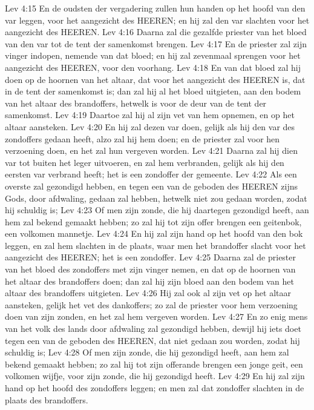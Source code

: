 Lev 4:15  En de oudsten der vergadering zullen hun handen op het hoofd van den var leggen, voor het aangezicht des HEEREN; en hij zal den var slachten voor het aangezicht des HEEREN.
Lev 4:16  Daarna zal die gezalfde priester van het bloed van den var tot de tent der samenkomst brengen.
Lev 4:17  En de priester zal zijn vinger indopen, nemende van dat bloed; en hij zal zevenmaal sprengen voor het aangezicht des HEEREN, voor den voorhang.
Lev 4:18  En van dat bloed zal hij doen op de hoornen van het altaar, dat voor het aangezicht des HEEREN is, dat in de tent der samenkomst is; dan zal hij al het bloed uitgieten, aan den bodem van het altaar des brandoffers, hetwelk is voor de deur van de tent der samenkomst.
Lev 4:19  Daartoe zal hij al zijn vet van hem opnemen, en op het altaar aansteken.
Lev 4:20  En hij zal dezen var doen, gelijk als hij den var des zondoffers gedaan heeft, alzo zal hij hem doen; en de priester zal voor hen verzoening doen, en het zal hun vergeven worden.
Lev 4:21  Daarna zal hij dien var tot buiten het leger uitvoeren, en zal hem verbranden, gelijk als hij den eersten var verbrand heeft; het is een zondoffer der gemeente.
Lev 4:22  Als een overste zal gezondigd hebben, en tegen een van de geboden des HEEREN zijns Gods, door afdwaling, gedaan zal hebben, hetwelk niet zou gedaan worden, zodat hij schuldig is;
Lev 4:23  Of men zijn zonde, die hij daartegen gezondigd heeft, aan hem zal bekend gemaakt hebben; zo zal hij tot zijn offer brengen een geitenbok, een volkomen mannetje.
Lev 4:24  En hij zal zijn hand op het hoofd van den bok leggen, en zal hem slachten in de plaats, waar men het brandoffer slacht voor het aangezicht des HEEREN; het is een zondoffer.
Lev 4:25  Daarna zal de priester van het bloed des zondoffers met zijn vinger nemen, en dat op de hoornen van het altaar des brandoffers doen; dan zal hij zijn bloed aan den bodem van het altaar des brandoffers uitgieten.
Lev 4:26  Hij zal ook al zijn vet op het altaar aansteken, gelijk het vet des dankoffers; zo zal de priester voor hem verzoening doen van zijn zonden, en het zal hem vergeven worden.
Lev 4:27  En zo enig mens van het volk des lands door afdwaling zal gezondigd hebben, dewijl hij iets doet tegen een van de geboden des HEEREN, dat niet gedaan zou worden, zodat hij schuldig is;
Lev 4:28  Of men zijn zonde, die hij gezondigd heeft, aan hem zal bekend gemaakt hebben; zo zal hij tot zijn offerande brengen een jonge geit, een volkomen wijfje, voor zijn zonde, die hij gezondigd heeft.
Lev 4:29  En hij zal zijn hand op het hoofd des zondoffers leggen; en men zal dat zondoffer slachten in de plaats des brandoffers.
